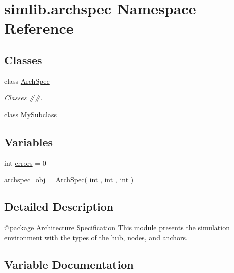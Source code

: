 \hypertarget{namespacesimlib_1_1archspec}{}\section{simlib.\+archspec Namespace Reference}
\label{namespacesimlib_1_1archspec}
\subsection*{Classes}
\begin{DoxyCompactItemize}
\item 
class \mbox{\hyperlink{classsimlib_1_1archspec_1_1_arch_spec}{Arch\+Spec}}
\begin{DoxyCompactList}\small\item\em Classes \#\#. \end{DoxyCompactList}\item 
class \mbox{\hyperlink{classsimlib_1_1archspec_1_1_my_subclass}{My\+Subclass}}
\end{DoxyCompactItemize}
\subsection*{Variables}
\begin{DoxyCompactItemize}
\item 
int \mbox{\hyperlink{namespacesimlib_1_1archspec_a417dd2991c99643d042aec6e1c95039d}{errors}} = 0
\item 
\mbox{\hyperlink{namespacesimlib_1_1archspec_a27bb5093b53649de1394d2ba20db9a51}{archspec\+\_\+obj}} = \mbox{\hyperlink{classsimlib_1_1archspec_1_1_arch_spec}{Arch\+Spec}}( int , int , int )
\end{DoxyCompactItemize}


\subsection{Detailed Description}
\begin{DoxyVerb}@package Architecture Specification
This module presents the simulation environment with the types of the hub, nodes, and
anchors.
\end{DoxyVerb}
 

\subsection{Variable Documentation}
\mbox{\label{namespacesimlib_1_1archspec_a27bb5093b53649de1394d2ba20db9a51}} 
